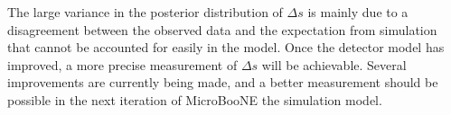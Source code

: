     The large variance in the posterior distribution of $\Delta s$ is mainly
    due to a disagreement between the observed data and the expectation from
    simulation that cannot be accounted for easily in the model. Once the
    detector model has improved, a more precise measurement of $\Delta s$ will
    be achievable. Several improvements are currently being made, and a better
    measurement should be possible in the next iteration of MicroBooNE the
    simulation model.


